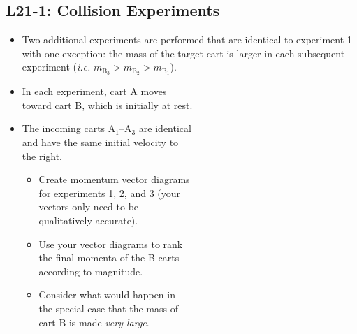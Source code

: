 \documentclass[]{article}
\newcommand{\Week}{21}
\begin{document}
\begin{PresentSpace}
\vspace{-10pt}
\section*{L\Week-1: Collision Experiments}
\vspace{-10pt}
\begin{itemize}
	\large
	\item Two additional experiments are performed that are identical to experiment 1 with one exception: the mass of the target cart is larger in each subsequent experiment (\textit{i.e.} $m_{\text{B}_{3}}>m_{\text{B}_{2}}>m_{\text{B}_{1}}$).
	\item In each experiment, cart A moves \\
	toward cart B, which is initially at rest.
	\item The incoming carts A$_{1}$--A$_{3}$ are identical \\
	and have the same initial velocity to \\
	the right.
	\begin{itemize}
		\item Create momentum vector diagrams \\
		for experiments 1, 2, and 3 (your \\
		vectors only need to be \\
		qualitatively accurate).
		\item Use your vector diagrams to rank \\
		the final momenta of the B carts \\
		according to magnitude.
		\item Consider what would happen in \\
		the special case that the mass of \\
		cart B is made \textit{very large}.
	\end{itemize}
\end{itemize}
\end{PresentSpace}
\end{document}
